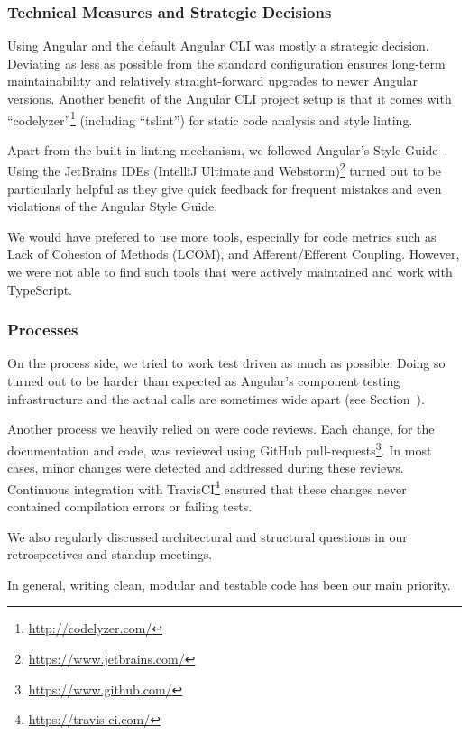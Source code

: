 \subsubsection{Technical Measures and Strategic Decisions}
Using Angular and the default Angular CLI was mostly a strategic decision.
Deviating as less as possible from the standard configuration ensures long-term maintainability and relatively straight-forward upgrades to newer Angular versions.
Another benefit of the Angular CLI project setup is that it comes with ``codelyzer''\footnote{\url{http://codelyzer.com/}} (including ``tslint'') for static code analysis and style linting.

Apart from the built-in linting mechanism, we followed Angular's Style Guide~\cite{angular-style-guide}.
Using the JetBrains IDEs (IntelliJ Ultimate and Webstorm)\footnote{\url{https://www.jetbrains.com/}} turned out to be particularly helpful as they give quick feedback for frequent mistakes and even violations of the Angular Style Guide.

We would have prefered to use more tools, especially for code metrics such as Lack of Cohesion of Methods (LCOM), and Afferent/Efferent Coupling.
However, we were not able to find such tools that were actively maintained and work with TypeScript.

\subsubsection{Processes}

On the process side, we tried to work test driven as much as possible.
Doing so turned out to be harder than expected as Angular's component testing infrastructure and the actual calls are sometimes wide apart (see Section~).

Another process we heavily relied on were code reviews.
Each change, for the documentation and code, was reviewed using GitHub pull-requests\footnote{\url{https://www.github.com/}}.
In most cases, minor changes were detected and addressed during these reviews.
Continuous integration with TravisCI\footnote{\url{https://travis-ci.com/}} ensured that these changes never contained compilation errors or failing tests.

We also regularly discussed architectural and structural questions in our retrospectives and standup meetings.

In general, writing clean, modular and testable code has been our main priority.

